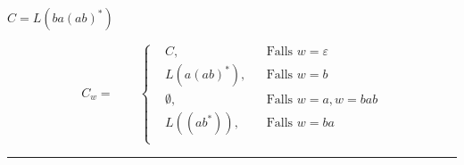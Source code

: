 \documentclass[a4paper, 11pt]{article}
\begin{document}
$C = L(ba(ab)^*)$ \\

\begin{center}
\begin{equation*}
 C_w = \qquad	
 \left\{
 \begin{aligned}
	& C, && \text{Falls } w = \varepsilon \\
    & L(a(ab)^*), && \text{Falls } w = b \\
    & \emptyset, && \text{Falls } w = a, w = bab \\
    & L((ab^*)), && \text{Falls } w = ba \\
	\end{aligned}
	\right.
\end{equation*}
\end{center}




\vspace{3cm}
\hrule
\end{document}
